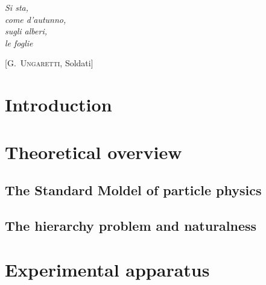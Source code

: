\documentclass[10pt,twoside,cucitura,classica,english,openany]{toptesi}
\begin{document}




\english

\cleardoublepage

\frontespizio
\paginavuota
\begin{dedica}
\end{dedica}

\ringraziamenti

\tablespagetrue\figurespagetrue \indici

\begin{citazioni}
  \textit{Si sta,\\come d'autunno,\\sugli alberi,\\le foglie }

  [\textsc{G.~Ungaretti}, Soldati]
\end{citazioni}


\chapter*{Introduction}
\label{cha:intro}


\mainmatter

\chapter{Theoretical overview}
\label{cha:theoretical-overview}

\section{The Standard Moldel of particle physics}
\label{sec:stand-mold-part}



\section{The hierarchy problem and naturalness}
\label{sec:hier-probl-natur}



\chapter{Experimental apparatus}
\label{cha:exper-appar}
\end{document}
